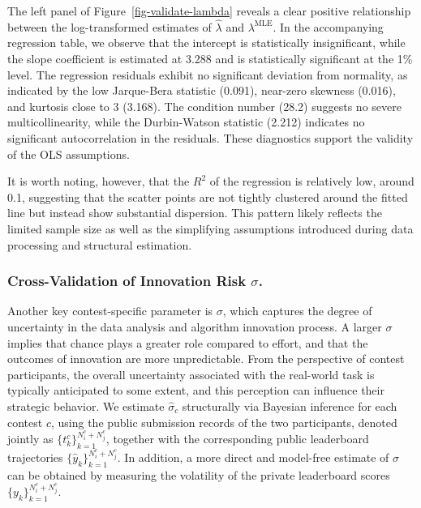 \documentclass[mnsc]{informs3}
\begin{document}
The left panel of Figure~\ref{fig-validate-lambda} reveals a clear positive relationship between the log-transformed estimates of $\hat\lambda$ and $\lambda^{\text{MLE}}$.
In the accompanying regression table, we observe that the intercept is statistically insignificant, while the slope coefficient is estimated at 3.288 and is statistically significant at the 1\% level. 
The regression residuals exhibit no significant deviation from normality, as indicated by the low Jarque-Bera statistic (0.091), near-zero skewness (0.016), and kurtosis close to 3 (3.168). 
The condition number (28.2) suggests no severe multicollinearity, while the Durbin-Watson statistic (2.212) indicates no significant autocorrelation in the residuals. 
These diagnostics support the validity of the OLS assumptions.

It is worth noting, however, that the $R^2$ of the regression is relatively low, around 0.1, suggesting that the scatter points are not tightly clustered around the fitted line but instead show substantial dispersion.
This pattern likely reflects the limited sample size as well as the simplifying assumptions introduced during data processing and structural estimation.




\subsubsection{Cross-Validation of Innovation Risk $\sigma$.}

Another key contest-specific parameter is $\sigma$, which captures the degree of uncertainty in the data analysis and algorithm innovation process. 
A larger $\sigma$ implies that chance plays a greater role compared to effort, and that the outcomes of innovation are more unpredictable. 
From the perspective of contest participants, the overall uncertainty associated with the real-world task is typically anticipated to some extent, and this perception can influence their strategic behavior.
We estimate $\hat{\sigma}_c$ structurally via Bayesian inference for each contest $c$, using the public submission records of the two participants, denoted jointly as $\{t_k^c\}_{k=1}^{N^c_i + N^c_j}$, together with the corresponding public leaderboard trajectories $\{\hat{y}_{k}\}_{k=1}^{N^c_i + N^c_j}$. 
In addition, a more direct and model-free estimate of $\sigma$ can be obtained by measuring the volatility of the private leaderboard scores $\{y_k\}_{k=1}^{N^c_i+N^c_j}$.
\end{document}
